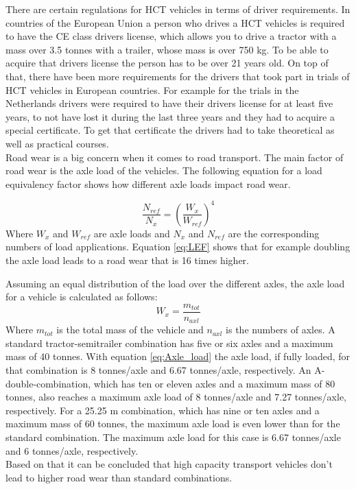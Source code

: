 \documentclass[ExampleMasters.tex]{subfiles}
\begin{document}
There are certain regulations for \gls{HCT} vehicles in terms of driver requirements. In countries of the European Union a person who drives a \gls{HCT} vehicles is required to have the CE class drivers license, which allows you to drive a tractor with a  mass over 3.5 tonnes with a trailer, whose mass is over 750 kg. To be able to acquire that drivers license the person has to be over 21 years old. \cite{EU_driving_licenses} 
On top of that, there have been more requirements for the drivers that took part in trials of \gls{HCT} vehicles in European countries. For example for the trials in the Netherlands drivers were required to have their drivers license for at least five years, to not have lost it during the last three years and they had to acquire a special certificate. To get that certificate the drivers had to take theoretical as well as practical courses.
\cite{HCT_vehicles_test_netherlands} \\

Road wear is a big concern when it comes to road transport. The main factor of road wear is the axle load of the vehicles. The following equation for a load equivalency factor shows how different axle loads impact road wear.   

\begin{equation}
\frac{N_{ref}}{N_x}=\left(\frac{W_x}{W_{ref}}\right)^4
\label{eq:LEF}
\end{equation}
Where $W_x$ and $W_{ref}$ are axle loads and $N_x$ and $N_{ref}$ are the corresponding numbers of load applications.\cite{road_wear} Equation \eqref{eq:LEF} shows that for example doubling the axle load leads to a road wear that is 16 times higher.

Assuming an equal distribution of the load over the different axles, the axle load for a vehicle is calculated as follows:\\
\begin{equation}
W_x=\frac{m_{tot}}{n_{axl}}
\label{eq:Axle_load}
\end{equation}
Where $m_{tot}$ is the total mass of the vehicle and $n_{axl}$ is the numbers of axles.
A standard tractor-semitrailer combination has five or six axles and a maximum mass of 40 tonnes.
With equation \eqref{eq:Axle_load} the axle load, if fully loaded, for that combination is 8 tonnes/axle and 6.67 tonnes/axle, respectively.
An A-double-combination, which has ten or eleven axles and a maximum mass of 80 tonnes, also reaches a maximum axle  load of 8 tonnes/axle and 7.27 tonnes/axle, respectively.
For a 25.25 m combination, which has nine or ten axles and a maximum mass of 60 tonnes, the maximum axle load is even lower than for the standard combination. The maximum axle load for this case is 6.67 tonnes/axle and 6 tonnes/axle, respectively.
\\Based on that it can be concluded that high capacity transport vehicles don't lead to higher road wear than standard combinations.
\end{document}
